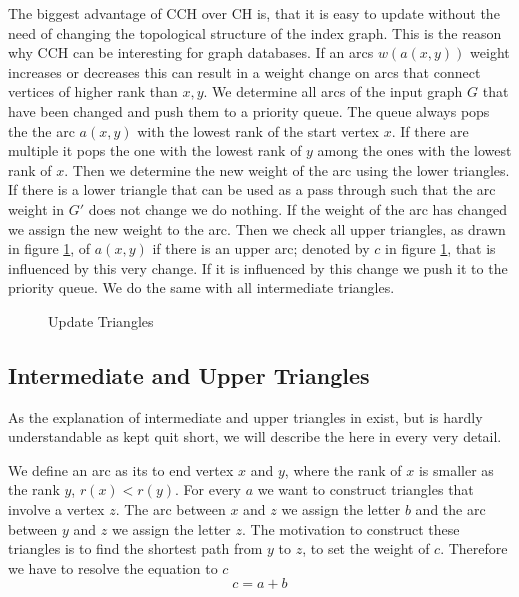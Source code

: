 The biggest advantage of CCH over CH is, that it is easy to update without the need of changing the topological structure of the index graph. This is the reason why CCH can be interesting for graph databases.
If an arcs $w(a(x, y))$ weight increases or decreases this can result in a weight change on arcs that connect vertices of higher rank than $x, y$. We determine all arcs of the input graph $G$ that have been changed 
and push them to a priority queue. The queue always pops the the arc $a(x,y)$ with the lowest rank of the start vertex $x$. If there are multiple it pops the one with the lowest rank of $y$ among the ones with the lowest rank of $x$. Then we determine 
the new weight of the arc using the lower triangles. If there is a lower triangle that can be used as a pass through such that the arc weight in $G'$ does not change we do nothing. If the weight of the arc has changed
we assign the new weight to the arc. Then we check all upper triangles, as drawn in figure \ref{fig:updateTriangles}, of $a(x,y)$ if there is an upper arc; denoted by $c$ in figure \ref{fig:updateTriangles}, that is influenced by this very change. If it is influenced by this
change we push it to the priority queue. We do the same with all intermediate triangles. 
\\


\begin{figure}
    \centering
    
    \caption{Update Triangles}
    \label{fig:updateTriangles}
\end{figure}

\subsection{Intermediate and Upper Triangles}

As the explanation of intermediate and upper triangles in \cite[Customization Contraction Hierarchies]{CCH} exist, but is hardly understandable as kept quit short, we will describe the here in every very detail.

We define an arc as its to end vertex $x$ and $y$, where the rank of $x$ is smaller as the rank $y$, $r(x) < r(y)$.
For every $a$ we want to construct triangles that involve a vertex $z$.
The arc between $x$ and $z$ we assign the letter $b$ and the arc between $y$ and $z$ we assign the letter $z$. 
The motivation to construct these triangles is to find the shortest path from $y$ to $z$, to set the weight of $c$. Therefore we have to resolve the equation to $c$
\begin{equation*}
    c = a + b
\end{equation*}

